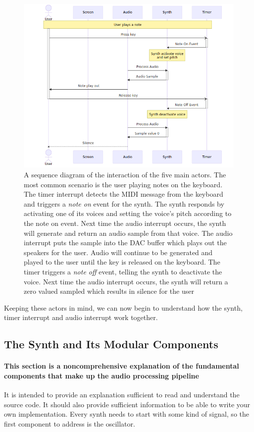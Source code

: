 \documentclass[acmlarge,screen]{acmart}
\begin{document}
	\begin{figure}[H]
		\centering
		\includegraphics[width=.7\linewidth]{play_note_sequence}
		\caption{A sequence diagram of the interaction of the five main actors. The most common scenario is the user playing notes on the keyboard. The timer interrupt detects the MIDI message from the keyboard and triggers a \textit{note on} event for the synth. The synth responds by activating one of its voices and setting the voice's pitch according to the note on event. Next time the audio interrupt occurs, the synth will generate and return an audio sample from that voice. The audio interrupt puts the sample into the DAC buffer which plays out the speakers for the user. Audio will continue to be generated and played to the user until the key is released on the keyboard. The timer triggers a \textit{note off} event, telling the synth to deactivate the voice. Next time the audio interrupt occurs, the synth will return a zero valued sampled which results in silence for the user}
	\end{figure}
	
	Keeping these actors in mind, we can now begin to understand how the synth, timer interrupt and audio interrupt work together.
	
\subsection{The Synth and Its Modular Components}
	\paragraph{This section is a noncomprehensive explanation of the fundamental components that make up the audio processing pipeline} It is intended to provide an explanation sufficient to read and understand the source code. It should also provide sufficient information to be able to write your own implementation. Every synth needs to start with some kind of signal, so the first component to address is the oscillator.
	
\end{document}
